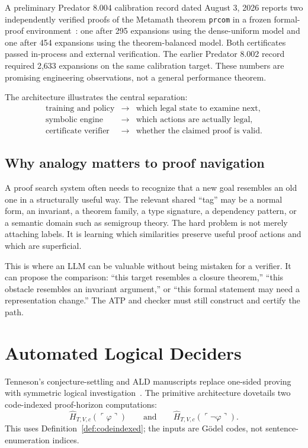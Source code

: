 \documentclass[11pt,oneside]{book}
\theoremstyle{definition}
\theoremstyle{remark}
\newcommand{\code}[1]{\ulcorner #1\urcorner}
\begin{document}
A preliminary Predator 8.004 calibration record dated August 3, 2026 reports two independently verified proofs of the Metamath theorem \texttt{prcom} in a frozen formal-proof environment~\cite{metamath, predator8004}: one after 295 expansions using the dense-uniform model and one after 454 expansions using the theorem-balanced model. Both certificates passed in-process and external verification. The earlier Predator 8.002 record required 2,633 expansions on the same calibration target. These numbers are promising engineering observations, not a general performance theorem.

The architecture illustrates the central separation:
\[
\begin{array}{rcl}
\text{training and policy} &\longrightarrow& \text{which legal state to examine next},\\
\text{symbolic engine} &\longrightarrow& \text{which actions are actually legal},\\
\text{certificate verifier} &\longrightarrow& \text{whether the claimed proof is valid}.
\end{array}
\]

\section{Why analogy matters to proof navigation}
A proof search system often needs to recognize that a new goal resembles an old one in a structurally useful way. The relevant shared ``tag'' may be a normal form, an invariant, a theorem family, a type signature, a dependency pattern, or a semantic domain such as semigroup theory. The hard problem is not merely attaching labels. It is learning which similarities preserve useful proof actions and which are superficial.

This is where an LLM can be valuable without being mistaken for a verifier. It can propose the comparison: ``this target resembles a closure theorem,'' ``this obstacle resembles an invariant argument,'' or ``this formal statement may need a representation change.'' The ATP and checker must still construct and certify the path.

\chapter{Automated Logical Deciders}\label{ch:ald}
Tenneson's conjecture-settling and ALD manuscripts replace one-sided proving with symmetric logical investigation~\cite{tennesonConjecture,tennesonALD}. The primitive architecture dovetails two code-indexed proof-horizon computations:
\[
\widehat H_{T,V,c}(\code{\varphi})
\qquad\text{and}\qquad
\widehat H_{T,V,c}(\code{\neg\varphi}).
\]
This uses Definition~\ref{def:codeindexed}; the inputs are G\"odel codes, not sentence-enumeration indices.
\end{document}
